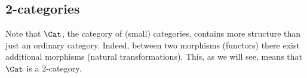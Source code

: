 \subsection{2-categories}

Note that $\Cat$, the category of (small) categories, contains more structure than just an ordinary category.
Indeed, between two morphisms (functors) there exist additional morphisms (natural transformations).
This, as we will see, means that $\Cat$ is a {\emphcolor $2$-category}.


